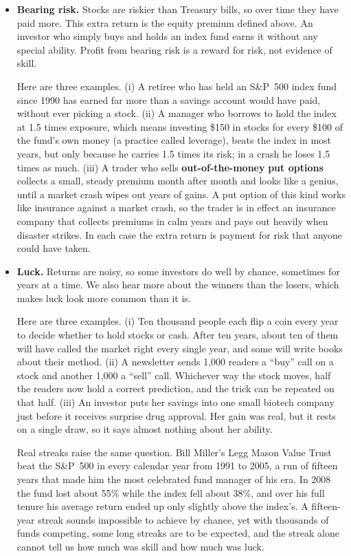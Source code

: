 \begin{itemize}
  \item \textbf{Bearing risk.} Stocks are riskier than Treasury bills, so over
  time they have paid more. This extra return is the equity premium defined
  above. An investor who simply buys and holds an index fund earns it without
  any special ability. Profit from bearing risk is a reward for risk, not
  evidence of skill.

  Here are three examples. (i) A retiree who has held an S\&P~500 index fund since
  1990 has earned far more than a savings account would have paid, without
  ever picking a stock. (ii) A manager who borrows to hold the index at
  1.5 times exposure, which means investing \$150 in stocks for every \$100
  of the fund's own money (a practice called leverage), beats the index in most years, but only because he
  carries 1.5 times its risk; in a crash he loses 1.5 times as much.
  (iii) A trader who sells \textbf{out-of-the-money} \textbf{put options} collects a small,
  steady premium month after month and looks like a genius, until a market
  crash wipes out years of gains. A put option of this kind works like
  insurance against a market crash, so the trader is in effect an insurance
  company that collects premiums in calm years and pays out heavily when
  disaster strikes. In each case the extra return is payment
  for risk that anyone could have taken.

  \item \textbf{Luck.} Returns are noisy, so some investors do well by
  chance, sometimes for years at a time. We also hear more about the winners
  than the losers, which makes luck look more common than it is.

  Here are three examples. (i) Ten thousand people each flip a coin every year to
  decide whether to hold stocks or cash. After ten years, about ten of them
  will have called the market right every single year, and some will write
  books about their method. (ii) A newsletter sends 1{,}000 readers a
  ``buy'' call on a stock and another 1{,}000 a ``sell'' call. Whichever way
  the stock moves, half the readers now hold a correct prediction, and the
  trick can be repeated on that half. (iii) An investor puts her savings into
  one small biotech company just before it receives surprise drug approval.
  Her gain was real, but it rests on a single draw, so it says almost nothing
  about her ability.

  Real streaks raise the same question. Bill Miller's Legg Mason Value Trust
  beat the S\&P~500 in every calendar year from 1991 to 2005, a run of fifteen
  years that made him the most celebrated fund manager of his era. In 2008
  the fund lost about 55\% while the index fell about 38\%, and over his full
  tenure his average return ended up only slightly above the index's. A
  fifteen-year streak sounds impossible to achieve by chance, yet with
  thousands of funds competing, some long streaks are to be expected, and
  the streak alone cannot tell us how much was skill and how much was luck.



\end{itemize}
